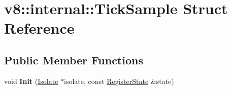 \hypertarget{structv8_1_1internal_1_1_tick_sample}{}\section{v8\+:\+:internal\+:\+:Tick\+Sample Struct Reference}
\label{structv8_1_1internal_1_1_tick_sample}
\subsection*{Public Member Functions}
\begin{DoxyCompactItemize}
\item 
\hypertarget{structv8_1_1internal_1_1_tick_sample_adbb8b34ca2060dbf17c1630410602847}{}void {\bfseries Init} (\hyperlink{classv8_1_1internal_1_1_isolate}{Isolate} $\ast$isolate, const \hyperlink{structv8_1_1internal_1_1_register_state}{Register\+State} \&state)\label{structv8_1_1internal_1_1_tick_sample_adbb8b34ca2060dbf17c1630410602847}

\end{DoxyCompactItemize}
